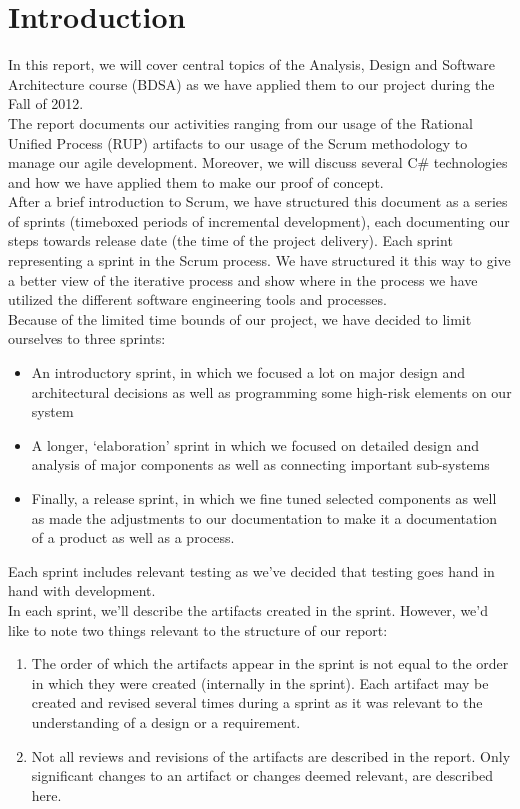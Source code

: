 \section{Introduction}
In this report, we will cover central topics of the Analysis, Design and Software Architecture course (BDSA) as we have applied them to our project during the Fall of 2012.\\
\newline
The report documents our activities ranging from our usage of the Rational Unified Process (RUP) artifacts \cite[p.~31]{OOAD} to our usage of the Scrum methodology to manage our agile development. Moreover, we will discuss several C\# technologies and how we have applied them to make our proof of concept.\\
\newline
After a brief introduction to Scrum, we have structured this document as a series of sprints (timeboxed periods of incremental development), each documenting our steps towards release date (the time of the project delivery). Each sprint representing a sprint in the Scrum process. We have structured it this way to give a better view of the iterative process and show where in the process we have utilized the different software engineering tools and processes.\\
\newline
Because of the limited time bounds of our project, we have decided to limit ourselves to three sprints:\\
\begin{itemize}
\item An introductory sprint, in which we focused a lot on major design and architectural decisions as well as programming some high-risk elements on our system
\item A longer, ‘elaboration' sprint in which we focused on detailed design and analysis of major components as well as connecting important sub-systems 
\item Finally, a release sprint, in which we fine tuned selected components as well as made the adjustments to our documentation to make it a documentation of a product as well as a process.
\end{itemize}
Each sprint includes relevant testing as we've decided that testing goes hand in hand with development.\\
\newline
In each sprint, we'll describe the artifacts created in the sprint. However,
we'd like to note two things relevant to the structure of our report:\\
\begin{enumerate}
\item The order of which the artifacts appear in the sprint is not equal to the
  order in which they were created (internally in the sprint). Each artifact
  may be created and revised several times during a sprint as it was relevant
  to the understanding of a design or a requirement. 
\item Not all reviews and revisions of the artifacts are described in the
  report. Only significant changes to an artifact or changes deemed relevant,
  are described here.
\end{enumerate}
